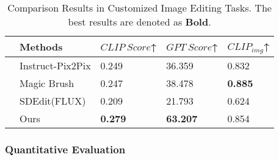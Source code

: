 


\begin{table}[ht]
\centering
\footnotesize %
\caption{Comparison Results in Customized Image Editing Tasks. The best results are denoted as \textbf{Bold}.}

\begin{tabular}{lp{2.0cm}p{1.5cm}p{1.5cm}p{1.5cm}}
\toprule
& \textbf{Methods}   & \textbf{$CLIP\ Score$}↑ & \textbf{$GPT\ Score$}↑  & \textbf{$CLIP_{img}$}↑ \\ \midrule
&Instruct-Pix2Pix         & 0.249  & 36.359                     & 0.832             \\ 
&Magic Brush              & 0.247     & 38.478               & \textbf{ 0.885}             \\ 
&SDEdit(FLUX)             & 0.209    & 21.793                 & 0.624             \\ 
&Ours                     & \textbf{0.279}   & \textbf{63.207}                & 0.854             \\  \midrule 

\end{tabular}
\label{tab:comparison_customized}
\end{table}





\subsubsection{Quantitative Evaluation}

